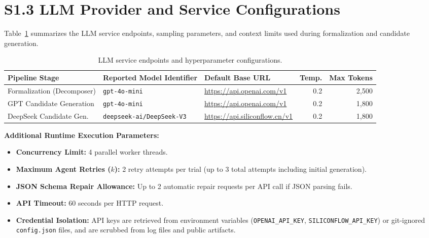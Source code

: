 \documentclass[11pt,letterpaper]{article}
\begin{document}
\section{S1.3 LLM Provider and Service Configurations}\label{sec:s13-service-configuration}

Table~\ref{tab:s1-model-service-configuration} summarizes the LLM service endpoints, sampling parameters, and context limits used during formalization and candidate generation.

\begin{table}[htbp]
\centering
\small
\caption{LLM service endpoints and hyperparameter configurations.}
\label{tab:s1-model-service-configuration}
\begin{tabular}{lllrr}
\toprule
Pipeline Stage & Reported Model Identifier & Default Base URL & Temp. & Max Tokens \\
\midrule
Formalization (Decomposer) & \texttt{gpt-4o-mini} & \url{https://api.openai.com/v1} & 0.2 & 2,500 \\
GPT Candidate Generation & \texttt{gpt-4o-mini} & \url{https://api.openai.com/v1} & 0.2 & 1,800 \\
DeepSeek Candidate Gen. & \texttt{deepseek-ai/DeepSeek-V3} & \url{https://api.siliconflow.cn/v1} & 0.2 & 1,800 \\
\bottomrule
\end{tabular}
\end{table}

\textbf{Additional Runtime Execution Parameters:}
\begin{itemize}
    \item \textbf{Concurrency Limit:} 4 parallel worker threads.
    \item \textbf{Maximum Agent Retries ($k$):} 2 retry attempts per trial (up to 3 total attempts including initial generation).
    \item \textbf{JSON Schema Repair Allowance:} Up to 2 automatic repair requests per API call if JSON parsing fails.
    \item \textbf{API Timeout:} 60 seconds per HTTP request.
    \item \textbf{Credential Isolation:} API keys are retrieved from environment variables (\texttt{OPENAI\_API\_KEY}, \texttt{SILICONFLOW\_API\_KEY}) or git-ignored \texttt{config.json} files, and are scrubbed from log files and public artifacts.
\end{itemize}

\end{document}
